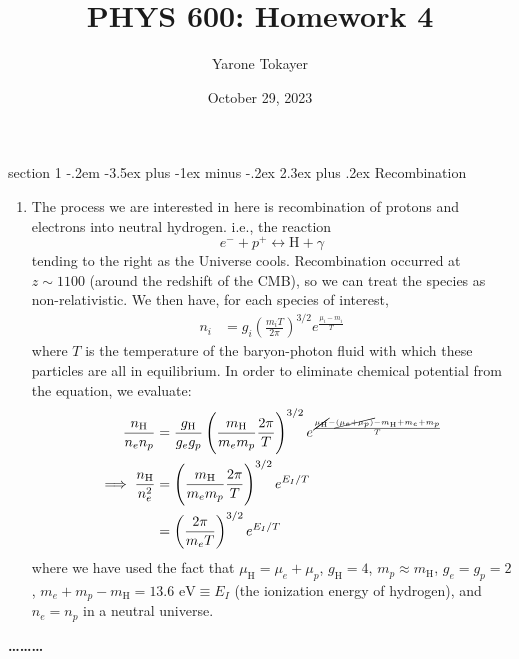 \documentclass[12pt]{article}
\makeatletter
\newenvironment{problem}{\@startsection
	{section}
	{1}
	{-.2em}
	{-3.5ex plus -1ex minus -.2ex}
	{2.3ex plus .2ex}
	{\pagebreak[3]%
		\large\bf\noindent{Problem }
	}
}
{%
	\begin{center}\large\bf \ldots\ldots\ldots\end{center}}
\makeatother
\begin{document}
	
	\title{PHYS 600: Homework 4}
	\author{Yarone Tokayer}
	\date{October 29, 2023}
	
	\maketitle
	
	\thispagestyle{empty}

	\begin{problem}{Recombination}
		\begin{enumerate}
			\item The process we are interested in here is recombination of protons and electrons into neutral hydrogen.  i.e., the reaction \begin{equation*}
				e^- + p^+ \leftrightarrow \mathrm{H} + \gamma
			\end{equation*} tending to the right as the Universe cools.  Recombination occurred at $z\sim 1100$ (around the redshift of the CMB), so we can treat the species as non-relativistic.  We then have, for each species of interest, \begin{align*}
				n_i &= g_i \left(\frac{m_i T}{2\pi}\right)^{3/2}e^\frac{\mu_i-m_i}{T}
			\end{align*} where $T$ is the temperature of the baryon-photon fluid with which these particles are all in equilibrium.  In order to eliminate chemical potential from the equation, we evaluate: \begin{align}
				\frac{n_\mathrm{H}}{n_en_p} &= \frac{g_\mathrm{H}}{g_eg_p} \left( \frac{m_\mathrm{H}}{m_em_p} \frac{ 2\pi}{T}\right)^{3/2} e^\frac{\cancel{\mu_\mathrm{H}} - \cancel{(\mu_e+\mu_p)} - m_\mathrm{H} + m_e + m_p}{T} \notag
				\\
				\implies \frac{n_\mathrm{H}}{n_e^2} &= \left( \frac{m_\mathrm{H}}{m_em_p} \frac{ 2\pi}{T}\right)^{3/2} e^{E_I/T} \notag
				\\
				&= \left( \frac{ 2\pi}{m_eT}\right)^{3/2} e^{E_I/T}  \label{eq:n_h/n_e^2}
			\end{align} where we have used the fact that $\mu_\mathrm{H} = \mu_e + \mu_p$, $g_\mathrm{H} = 4$, $m_p\approx m_\mathrm{H}$, $g_e = g_p = 2$, $m_e + m_p - m_\mathrm{H} = 13.6 \text{ eV} \equiv E_I$ (the ionization energy of hydrogen), and $n_e = n_p$ in a neutral universe.\\
			

\end{enumerate}
\end{problem}
\end{document}
